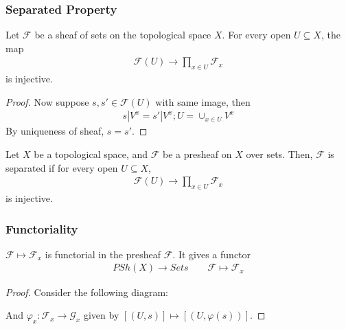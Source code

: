 \documentclass[Total.tex]{subfiles}
\begin{document}
				\subsubsection{Separated Property}
					\begin{lemma}
						Let $\mathcal{F}$ be a sheaf of sets on the topological space $X$. For every open $U\subseteq X$, the map
						\begin{gather*}
							\mathcal{F}(U)\rightarrow \prod_{x\in U}\mathcal{F}_x
						\end{gather*}
						is injective.
					\end{lemma}
					\begin{proof}
						Now suppose $s,s'\in \mathcal{F}(U)$ with same image, then
						\begin{gather*}
							s|V^x=s'|V^x;U=\cup_{x\in U} V^x
						\end{gather*}
						By uniqueness of sheaf, $s=s'$.
					\end{proof}
					\begin{Def}
						Let $X$ be a topological space, and $\mathcal{F}$ be a presheaf on $X$ over sets. Then, $\mathcal{F}$ is separated if for every open $U\subseteq X$,
						\begin{gather*}
							\mathcal{F}(U)\rightarrow \prod_{x\in U} \mathcal{F}_x
						\end{gather*}
						is injective.
					\end{Def}
				\subsubsection{Functoriality}
					\begin{proposition}
						$\mathcal{F}\mapsto \mathcal{F}_x$ is functorial in the presheaf $\mathcal{F}$. It gives a functor
						\begin{gather*}
							PSh(X)\rightarrow Sets\qquad \mathcal{F}\mapsto \mathcal{F}_x
						\end{gather*}
					\end{proposition}
					\begin{proof}
						Consider the following diagram:
						\begin{center}
						\end{center}
						And $\varphi_x:\mathcal{F}_x\rightarrow \mathcal{G}_x$ given by $[(U,s)]\mapsto [(U,\varphi(s))]$.
					\end{proof}
					
\end{document}
